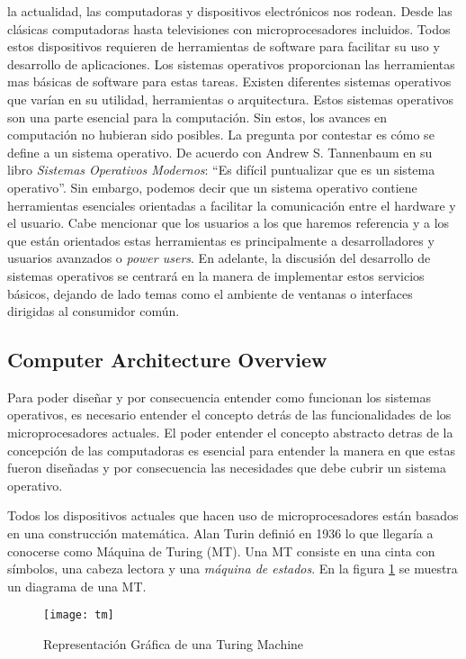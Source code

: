  la actualidad, las computadoras y dispositivos electrónicos nos
rodean. Desde las clásicas computadoras hasta televisiones con
microprocesadores incluidos. Todos estos dispositivos requieren de herramientas
de software para facilitar su uso y desarrollo de aplicaciones. Los sistemas
operativos proporcionan las herramientas mas básicas de software para estas
tareas. Existen diferentes sistemas operativos que varían en su utilidad,
herramientas o arquitectura. Estos sistemas operativos son una parte esencial
para la computación. Sin estos, los avances en computación no hubieran sido
posibles.  La pregunta por contestar es cómo se define a un sistema
operativo. De acuerdo con Andrew S. Tannenbaum en su libro \emph{Sistemas
Operativos Modernos}: ``Es difícil puntualizar que es un sistema
operativo''. Sin embargo, podemos decir que un sistema operativo contiene
herramientas esenciales orientadas a facilitar la comunicación entre el
hardware y el usuario. Cabe mencionar que los usuarios a los que haremos
referencia y a los que están orientados estas herramientas es principalmente a
desarrolladores y usuarios avanzados o \emph{power users}. En adelante, la
discusión del desarrollo de sistemas operativos se centrará en la manera de
implementar estos servicios básicos, dejando de lado temas como el ambiente de
ventanas o interfaces dirigidas al consumidor común.

\subsection{Computer Architecture Overview}

Para poder diseñar y por consecuencia entender como funcionan los sistemas
operativos, es necesario entender el concepto detrás de las funcionalidades de
los microprocesadores actuales. El poder entender el concepto abstracto detras
de la concepción de las computadoras es esencial para entender la manera en que
estas fueron diseñadas y por consecuencia las necesidades que debe cubrir un
sistema operativo.

Todos los dispositivos actuales que hacen uso de microprocesadores están
basados en una construcción matemática. Alan Turin definió en 1936 lo que
llegaría a conocerse como Máquina de Turing (MT).  Una MT consiste en una cinta
con símbolos, una cabeza lectora y una \emph{máquina de estados}. En la figura
\ref{fig:tm} se muestra un diagrama de una MT. 

\begin{figure}[htbp]
  \centering
  \texttt{[image: tm]}
  \caption{Representación Gráfica de una Turing Machine}
  \label{fig:tm}
\end{figure}

